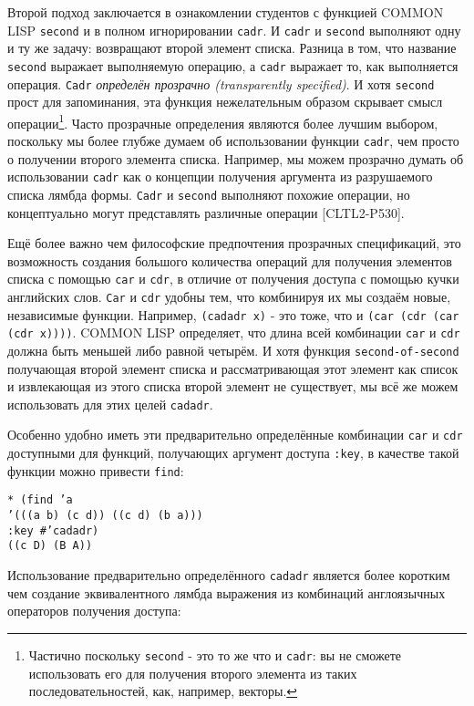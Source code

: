 Второй подход заключается в ознакомлении студентов с функцией COMMON LISP \verb"second" и в полном игнорировании \verb"cadr". И \verb"cadr" и \verb"second" выполняют одну и ту же задачу: возвращают второй элемент списка. Разница в том, что название \verb"second" выражает выполняемую операцию, а \verb"cadr" выражает то, как выполняется операция. \verb"Cadr" \emph{определён прозрачно (transparently specified)}. И хотя \verb"second" прост для запоминания, эта функция нежелательным образом скрывает смысл операции\footnote{Частично поскольку \verb"second" - это то же что и \verb"cadr": вы не сможете использовать его для получения второго элемента из таких последовательностей, как, например, векторы.}. Часто прозрачные определения являются более лучшим выбором, поскольку мы более глубже думаем об использовании функции \verb"cadr", чем просто о получении второго элемента списка. Например, мы можем прозрачно думать об использовании \verb"cadr" как о концепции получения аргумента из разрушаемого списка лямбда формы. \verb"Cadr" и \verb"second" выполняют похожие операции, но концептуально могут представлять различные операции [CLTL2-P530].



Ещё более важно чем философские предпочтения прозрачных спецификаций, это возможность создания большого количества операций для получения элементов списка с помощью \verb"car" и \verb"cdr", в отличие от получения доступа с помощью кучки английских слов. \verb"Car" и \verb"cdr" удобны тем, что комбинируя их мы создаём новые, независимые функции. Например, \verb"(cadadr x)" - это тоже, что и \verb"(car (cdr (car (cdr x))))". COMMON LISP определяет, что длина всей комбинации \verb"car" и \verb"cdr" должна быть меньшей либо равной четырём. И хотя функция \verb"second-of-second" получающая второй элемент списка и рассматривающая этот элемент как список и извлекающая из этого списка второй элемент не существует, мы всё же можем использовать для этих целей \verb"cadadr".

Особенно удобно иметь эти предварительно определённые комбинации \verb"car" и \verb"cdr" доступными для функций, получающих аргумент доступа \verb":key", в качестве такой функции можно привести \verb"find":

\begin{verbatim}
* (find ’a
’(((a b) (c d)) ((c d) (b a)))
:key #’cadadr)
((c D) (B A))
\end{verbatim}

Использование предварительно определённого \verb"cadadr" является более коротким чем создание эквивалентного лямбда выражения из комбинаций англоязычных операторов получения доступа:

